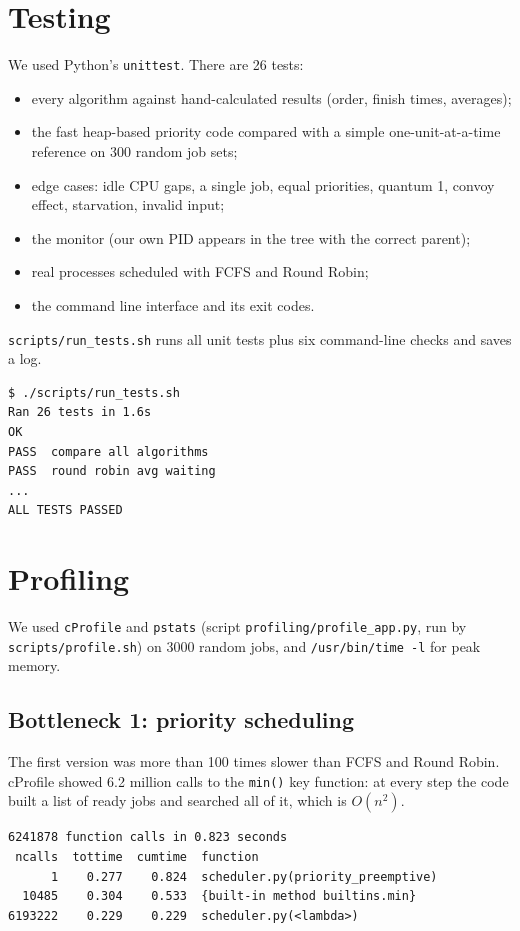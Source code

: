 \documentclass[11pt,a4paper]{article}
\begin{document}
\section{Testing}
We used Python's \texttt{unittest}. There are 26 tests:
\begin{itemize}
  \item every algorithm against hand-calculated results (order, finish times, averages);
  \item the fast heap-based priority code compared with a simple one-unit-at-a-time
        reference on 300 random job sets;
  \item edge cases: idle CPU gaps, a single job, equal priorities, quantum 1, convoy effect,
        starvation, invalid input;
  \item the monitor (our own PID appears in the tree with the correct parent);
  \item real processes scheduled with FCFS and Round Robin;
  \item the command line interface and its exit codes.
\end{itemize}
\texttt{scripts/run\_tests.sh} runs all unit tests plus six command-line checks and saves a log.

\begin{lstlisting}
$ ./scripts/run_tests.sh
Ran 26 tests in 1.6s
OK
PASS  compare all algorithms
PASS  round robin avg waiting
...
ALL TESTS PASSED
\end{lstlisting}

\section{Profiling}\label{sec:profiling}
We used \texttt{cProfile} and \texttt{pstats} (script \texttt{profiling/profile\_app.py},
run by \texttt{scripts/profile.sh}) on 3000 random jobs, and \texttt{/usr/bin/time -l} for
peak memory.

\subsection{Bottleneck 1: priority scheduling}
The first version was more than 100 times slower than FCFS and Round Robin. cProfile showed
6.2 million calls to the \texttt{min()} key function: at every step the code built a list
of ready jobs and searched all of it, which is $O(n^2)$.

\begin{lstlisting}[caption={cProfile output before the fix (shortened)}]
6241878 function calls in 0.823 seconds
 ncalls  tottime  cumtime  function
      1    0.277    0.824  scheduler.py(priority_preemptive)
  10485    0.304    0.533  {built-in method builtins.min}
6193222    0.229    0.229  scheduler.py(<lambda>)
\end{lstlisting}
\end{document}
